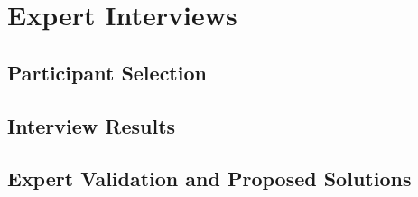 
\newpage
\section{Expert Interviews}

\subsection{Participant Selection}


\subsection{Interview Results}


\subsection{Expert Validation and Proposed Solutions}

